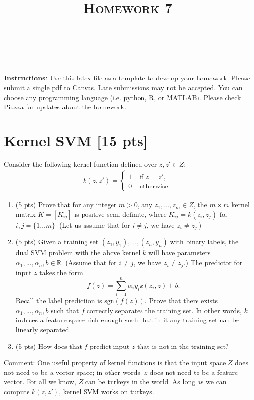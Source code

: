 \documentclass[a4paper]{article}
\title{\textsc{Homework 7}} %
\author{
\red{$>>$NAME HERE$<<$} \\
\red{$>>$ID HERE$<<$}\\
}
\date{}
\theoremstyle{definition}
\newcommand{\sgn}{\mathrm{sgn}}
\def\R{\mathbb R}
\begin{document}
\maketitle 

\textbf{Instructions:}
Use this latex file as a template to develop your homework. Please submit a single pdf to Canvas. Late submissions may not be accepted. You can choose any programming language (i.e. python, R, or MATLAB). Please check Piazza for updates about the homework.
\vspace{0.1in}

\section{Kernel SVM [15 pts]}
Consider the following kernel function defined over $z,z'\in Z$:
\begin{align*}
k(z,z') =
\begin{cases}
1 & \text{~if~} z=z', \\
0 & \text{~otherwise.}
\end{cases}
\end{align*}
\begin{enumerate}
\item (5 pts) Prove that for any integer $m>0$, any $z_1, \ldots, z_m \in Z$, the $m \times m$ kernel matrix $K=[K_{ij}]$ is positive semi-definite, where $K_{ij}=k(z_i, z_j)$ for $i,j=\{1\ldots m\}$. (Let us assume that for $i \neq j$, we have $z_i \neq z_j$.)

\item (5 pts) Given a training set $(z_1, y_1), \ldots, (z_n, y_n)$ with binary labels, the dual SVM problem with the above kernel $k$ will have parameters $\alpha_1, \ldots, \alpha_n, b \in \R$.  (Assume that for $i \neq j$, we have $z_i \neq z_j$.) The predictor for input $z$ takes the form
$$f(z) = \sum_{i=1}^n \alpha_i y_i k(z_i, z) + b.$$
Recall the label prediction is $\sgn(f(z))$.
Prove that there exists $\alpha_1, \ldots, \alpha_n, b$ such that $f$ correctly separates the training set.
In other words, $k$ induces a feature space rich enough such that in it any training set can be linearly separated.

\item (5 pts) How does that $f$ predict input $z$ that is not in the training set?

\end{enumerate}

Comment: One useful property of kernel functions is that the input space $Z$ does not need to be a vector space; in other words, $z$ does not need to be a feature vector.  For all we know, $Z$ can be turkeys in the world.  As long as we can compute $k(z,z')$, kernel SVM works on turkeys.
\end{document}
